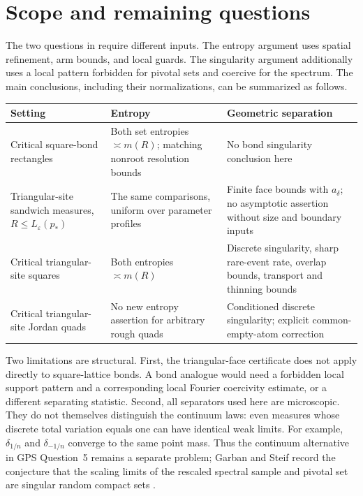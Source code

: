 \documentclass[11pt]{amsart}
\theoremstyle{remark}
\begin{document}
\section{Scope and remaining questions}\label{sec:scope}

The two questions in \cite[Section~11]{GPS} require different inputs. The entropy argument uses spatial refinement, arm bounds, and local guards. The singularity argument additionally uses a local pattern forbidden for pivotal sets and coercive for the spectrum. The main conclusions, including their normalizations, can be summarized as follows.

\begin{center}
\small
\begin{tabularx}{\textwidth}{@{}>{\raggedright\arraybackslash}p{}>{\raggedright\arraybackslash}p{}>{\raggedright\arraybackslash}X@{}}
\hline
Setting & Entropy & Geometric separation\\
\hline
Critical square-bond rectangles & Both set entropies $\asymp m(R)$; matching nonroot resolution bounds & No bond singularity conclusion here\\[5pt]
Triangular-site sandwich measures, $R\le L_\varepsilon(p_*)$ & The same comparisons, uniform over parameter profiles & Finite face bounds with $a_\delta$; no asymptotic assertion without size and boundary inputs\\[5pt]
Critical triangular-site squares & Both entropies $\asymp m(R)$ & Discrete singularity, sharp rare-event rate, overlap bounds, transport and thinning bounds\\[5pt]
Critical triangular-site Jordan quads & No new entropy assertion for arbitrary rough quads & Conditioned discrete singularity; explicit common-empty-atom correction\\
\hline
\end{tabularx}
\end{center}

Two limitations are structural. First, the triangular-face certificate does not apply directly to square-lattice bonds. A bond analogue would need a forbidden local support pattern and a corresponding local Fourier coercivity estimate, or a different separating statistic. Second, all separators used here are microscopic. They do not themselves distinguish the continuum laws: even measures whose discrete total variation equals one can have identical weak limits. For example, $\delta_{1/n}$ and $\delta_{-1/n}$ converge to the same point mass. Thus the continuum alternative in GPS Question~5 remains a separate problem; Garban and Steif record the conjecture that the scaling limits of the rescaled spectral sample and pivotal set are singular random compact sets \cite[Chapter~10]{GS}.
\end{document}
